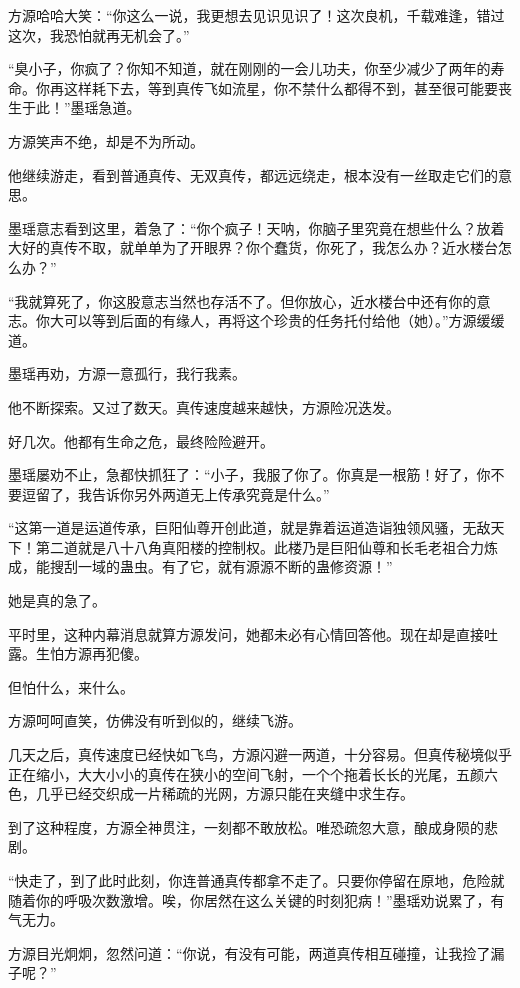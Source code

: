 \begin{this_body}
方源哈哈大笑：“你这么一说，我更想去见识见识了！这次良机，千载难逢，错过这次，我恐怕就再无机会了。”

“臭小子，你疯了？你知不知道，就在刚刚的一会儿功夫，你至少减少了两年的寿命。你再这样耗下去，等到真传飞如流星，你不禁什么都得不到，甚至很可能要丧生于此！”墨瑶急道。

方源笑声不绝，却是不为所动。

他继续游走，看到普通真传、无双真传，都远远绕走，根本没有一丝取走它们的意思。

墨瑶意志看到这里，着急了：“你个疯子！天呐，你脑子里究竟在想些什么？放着大好的真传不取，就单单为了开眼界？你个蠢货，你死了，我怎么办？近水楼台怎么办？”

“我就算死了，你这股意志当然也存活不了。但你放心，近水楼台中还有你的意志。你大可以等到后面的有缘人，再将这个珍贵的任务托付给他（她）。”方源缓缓道。

墨瑶再劝，方源一意孤行，我行我素。

他不断探索。又过了数天。真传速度越来越快，方源险况迭发。

好几次。他都有生命之危，最终险险避开。

墨瑶屡劝不止，急都快抓狂了：“小子，我服了你了。你真是一根筋！好了，你不要逗留了，我告诉你另外两道无上传承究竟是什么。”

“这第一道是运道传承，巨阳仙尊开创此道，就是靠着运道造诣独领风骚，无敌天下！第二道就是八十八角真阳楼的控制权。此楼乃是巨阳仙尊和长毛老祖合力炼成，能搜刮一域的蛊虫。有了它，就有源源不断的蛊修资源！”

她是真的急了。

平时里，这种内幕消息就算方源发问，她都未必有心情回答他。现在却是直接吐露。生怕方源再犯傻。

但怕什么，来什么。

方源呵呵直笑，仿佛没有听到似的，继续飞游。

几天之后，真传速度已经快如飞鸟，方源闪避一两道，十分容易。但真传秘境似乎正在缩小，大大小小的真传在狭小的空间飞射，一个个拖着长长的光尾，五颜六色，几乎已经交织成一片稀疏的光网，方源只能在夹缝中求生存。

到了这种程度，方源全神贯注，一刻都不敢放松。唯恐疏忽大意，酿成身陨的悲剧。

“快走了，到了此时此刻，你连普通真传都拿不走了。只要你停留在原地，危险就随着你的呼吸次数激增。唉，你居然在这么关键的时刻犯病！”墨瑶劝说累了，有气无力。

方源目光炯炯，忽然问道：“你说，有没有可能，两道真传相互碰撞，让我捡了漏子呢？”


\end{this_body}
